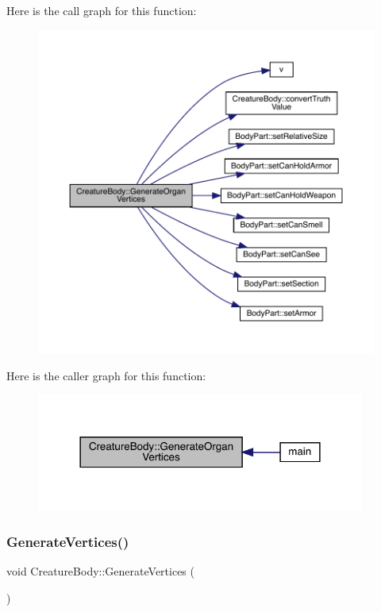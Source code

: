 Here is the call graph for this function\+:
\nopagebreak
\begin{figure}[H]
\begin{center}
\leavevmode
\includegraphics[width=350pt]{da/d7d/class_creature_body_a9cf5cffe6209ed851bf32c2b164d9391_cgraph}
\end{center}
\end{figure}
Here is the caller graph for this function\+:
\nopagebreak
\begin{figure}[H]
\begin{center}
\leavevmode
\includegraphics[width=306pt]{da/d7d/class_creature_body_a9cf5cffe6209ed851bf32c2b164d9391_icgraph}
\end{center}
\end{figure}
\mbox{\label{class_creature_body_af7047fb13005abbb9a816c0dd64af873}} 
\subsubsection{\texorpdfstring{Generate\+Vertices()}{GenerateVertices()}}
{\footnotesize\ttfamily void Creature\+Body\+::\+Generate\+Vertices (\begin{DoxyParamCaption}{ }\end{DoxyParamCaption})}


